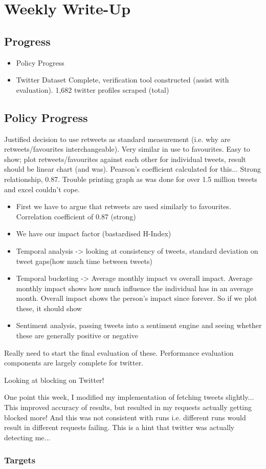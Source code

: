 \chapter{Weekly Write-Up}\label{C:us}

\section{Progress}

\begin{itemize}
 \item Policy Progress
 \item Twitter Dataset Complete, verification tool constructed (assist with evaluation). 1,682 twitter profiles scraped (total)
\end{itemize}

\section{Policy Progress}

Justified decision to use retweets as standard measurement (i.e. why are retweets/favourites interchangeable). Very similar in use to favourites. Easy to show; plot retweets/favourites against each other for individual tweets, result should be linear chart (and was). Pearson's coefficient calculated for this... Strong relationship, 0.87. Trouble printing graph as was done for over 1.5 million tweets and excel couldn't cope.


\begin{itemize}
 \item First we have to argue that retweets are used similarly to favourites. Correlation coefficient of 0.87 (strong)
 \item We have our impact factor (bastardised H-Index)
 \item Temporal analysis -> looking at consistency of tweets, standard deviation on tweet gaps(how much time between tweets)
 \item Temporal bucketing -> Average monthly impact vs overall impact. Average monthly impact shows how much influence the individual has in an average month. Overall impact shows the person's impact since forever. So if we plot these, it should show 
 \item Sentiment analysis, passing tweets into a sentiment engine and seeing whether these are generally positive or negative
\end{itemize}

Really need to start the final evaluation of these. Performance evaluation components are largely complete for twitter.

Looking at blocking on Twitter!

One point this week, I modified my implementation of fetching tweets slightly... This improved accuracy of results, but resulted in my requests actually getting blocked more! And this was not consistent with runs i.e. different runs would result in different requests failing. This is a hint that twitter was actually detecting me...


\subsection{Targets}


